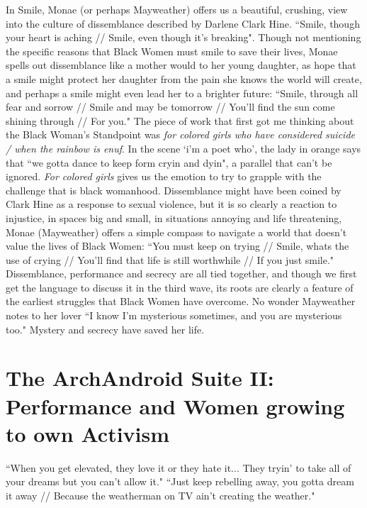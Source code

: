 \documentclass[a4paper, 11pt]{article} %
\begin{document}
In Smile, Monae (or perhaps Mayweather) offers us a beautiful, crushing, view into the culture of dissemblance described by Darlene Clark Hine\cite{hine}.
``Smile, though your heart is aching // Smile, even though it's breaking"\cite{smile}.
Though not mentioning the specific reasons that Black Women must smile to save their lives, Monae spells out dissemblance like a mother would to her young daughter, as hope that a smile might protect her daughter from the pain she knows the world will create, and perhaps a smile might even lead her to a brighter future:
``Smile, through all fear and sorrow // Smile and may be tomorrow // You'll find the sun come shining through // For you."\cite{smile}
The piece of work that first got me thinking about the Black Woman's Standpoint was \emph{for colored girls who have considered suicide / when the rainbow is enuf}.
In the scene `i'm a poet who', the lady in orange says that ``we gotta dance to keep form cryin and dyin"\cite{forcoloredgirls}, a parallel that can't be ignored.
\emph{For colored girls} gives us the emotion to try to grapple with the challenge that is black womanhood.
Dissemblance might have been coined by Clark Hine as a response to sexual violence, but it is so clearly a reaction to injustice, in spaces big and small, in situations annoying and life threatening, Monae (Mayweather) offers a simple compass to navigate a world that doesn't value the lives of Black Women:
``You must keep on trying // Smile, whats the use of crying // You'll find that life is still worthwhile // If you just smile."\cite{smile}
Dissemblance, performance and secrecy are all tied together, and though we first get the language to discuss it in the third wave, its roots are clearly a feature of the earliest struggles that Black Women have overcome.
No wonder Mayweather notes to her lover ``I know I'm mysterious sometimes, and you are mysterious too."\cite{primetime}
Mystery and secrecy have saved her life.


\section*{The ArchAndroid Suite II: Performance and Women growing to own Activism}

``When you get elevated, they love it or they hate it... They tryin' to take all of your dreams but you can't allow it."\cite{danceordie}
``Just keep rebelling away, you gotta dream it away // Because the weatherman on TV ain't creating the weather."\cite{danceordie}
\end{document}
